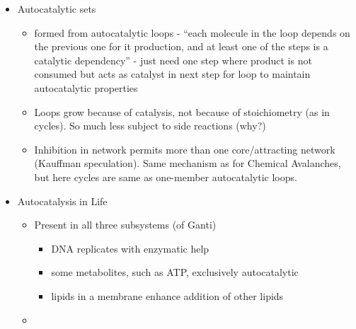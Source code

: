\begin{itemize}
\begin{itemize}
\begin{itemize}
\begin{itemize}
					\end{itemize}
				\end{itemize}
				\item
				
				Autocatalytic sets
				
				
				\begin{itemize}
					\item
					
					formed from autocatalytic loops - ``each molecule in the loop
					depends on the previous one for it production, and at least one of
					the steps is a catalytic dependency'' - just need one step where
					product is not consumed but acts as catalyst in next step for loop
					to maintain autocatalytic properties
					
					\item
					
					Loops grow because of catalysis, not because of stoichiometry (as
					in cycles). So much less subject to side reactions (why?)
					
					\item
					
					Inhibition in network permits more than one core/attracting
					network (Kauffman speculation). Same mechanism as for Chemical
					Avalanches, but here cycles are same as one-member autocatalytic
					loops.
					
				\end{itemize}
				\item
				
				Autocatalysis in Life
				
				
				\begin{itemize}
					\item
					
					Present in all three subsystems (of Ganti)
					
					
					\begin{itemize}
						\item
						
						DNA replicates with enzymatic help
						
						\item
						
						some metabolites, such as ATP, exclusively autocatalytic
						
						\item
						
						lipids in a membrane enhance addition of other lipids
						
					\end{itemize}
					\item
					

\end{itemize}
\end{itemize}
\end{itemize}
